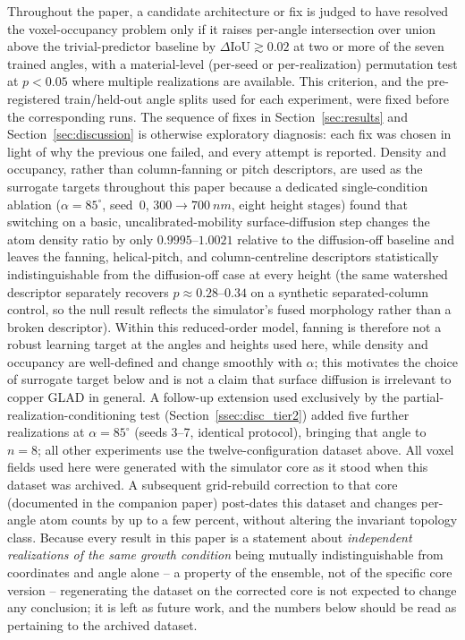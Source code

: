 \documentclass[aip,amsmath,amssymb,reprint]{revtex4-1}
\renewcommand{\ang}{\ensuremath{\alpha}} %
\newcommand{\iou}{\ensuremath{\mathrm{IoU}}}
\begin{document}
Throughout the paper, a candidate architecture or fix is judged to have
resolved the voxel-occupancy problem only if it raises per-angle intersection
over union above the trivial-predictor baseline by $\Delta\iou \gtrsim 0.02$
at two or more of the seven trained angles, with a material-level (per-seed or
per-realization) permutation test at $p<0.05$ where multiple realizations are
available. This criterion, and the pre-registered train/held-out angle splits
used for each experiment, were fixed before the corresponding runs. The
sequence of fixes in Section~\ref{sec:results} and Section~\ref{sec:discussion}
is otherwise exploratory diagnosis: each fix was chosen in light of why the
previous one failed, and every attempt is reported.
Density and occupancy, rather than column-fanning or pitch descriptors,
are used as the surrogate targets throughout this paper because a
dedicated single-condition ablation ($\alpha=85^{\circ}$, seed~0,
$300\to\SI{700}{nm}$, eight height stages) found that switching on a
basic, uncalibrated-mobility surface-diffusion step changes the atom
density ratio by only $0.9995$--$1.0021$ relative to the diffusion-off
baseline and leaves the fanning, helical-pitch, and column-centreline
descriptors statistically indistinguishable from the diffusion-off case
at every height (the same watershed descriptor separately recovers
$p\approx0.28$--$0.34$ on a synthetic separated-column control, so the
null result reflects the simulator's fused morphology rather than a
broken descriptor). Within this reduced-order model, fanning is
therefore not a robust learning target at the angles and heights used
here, while density and occupancy are well-defined and change smoothly
with $\ang$; this motivates the choice of surrogate target below and
is not a claim that surface diffusion is irrelevant to copper GLAD in
general.
A follow-up extension used exclusively by the partial-realization-conditioning test
(Section~\ref{ssec:disc_tier2}) added five further realizations at $\ang=85^{\circ}$
(seeds 3--7, identical protocol), bringing that angle to $n=8$; all other experiments
use the twelve-configuration dataset above.
All voxel fields used here were generated with the simulator core as it stood when this
dataset was archived. A subsequent grid-rebuild correction to that core (documented in
the companion paper) post-dates this dataset and changes per-angle atom counts by up to a
few percent, without altering the invariant topology class. Because every result in this
paper is a statement about \emph{independent realizations of the same growth condition}
being mutually indistinguishable from coordinates and angle alone -- a property of the
ensemble, not of the specific core version -- regenerating the dataset on the corrected
core is not expected to change any conclusion; it is left as future work, and the numbers
below should be read as pertaining to the archived dataset.
\end{document}
